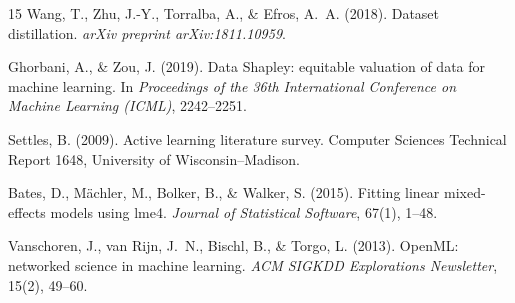 \documentclass[11pt,a4paper]{article}
\begin{document}
\begin{thebibliography}{15}
Wang, T., Zhu, J.-Y., Torralba, A., \& Efros, A.~A. (2018).
Dataset distillation.
\textit{arXiv preprint arXiv:1811.10959}.

Ghorbani, A., \& Zou, J. (2019).
Data Shapley: equitable valuation of data for machine learning.
In \textit{Proceedings of the 36th International Conference on Machine Learning
(ICML)}, 2242--2251.

Settles, B. (2009).
Active learning literature survey.
Computer Sciences Technical Report 1648, University of Wisconsin--Madison.

Bates, D., Mächler, M., Bolker, B., \& Walker, S. (2015).
Fitting linear mixed-effects models using lme4.
\textit{Journal of Statistical Software}, 67(1), 1--48.

Vanschoren, J., van Rijn, J.~N., Bischl, B., \& Torgo, L. (2013).
OpenML: networked science in machine learning.
\textit{ACM SIGKDD Explorations Newsletter}, 15(2), 49--60.

\end{thebibliography}
\end{document}
